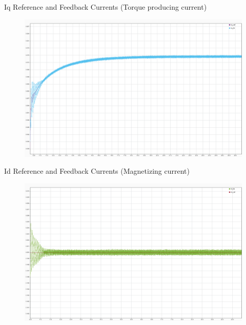 \begin{frame}{Iq Reference and Feedback Currents (Torque producing current)}
	\begin{figure}
		\centering
		\includegraphics[width=\textwidth]{sections/section3/images/simulationResutls/Iq_ref_fb.png}
	\end{figure}
\end{frame}

\begin{frame}{Id Reference and Feedback Currents (Magnetizing current)}
	\begin{figure}
		\centering
		\includegraphics[width=\textwidth]{sections/section3/images/simulationResutls/Id_ref_fb.png}
	\end{figure}
\end{frame}

